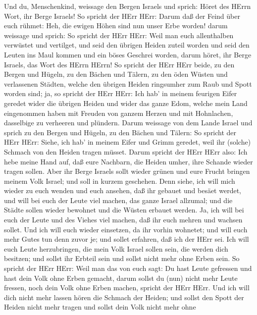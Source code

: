  Und du, Menschenkind, weissage den Bergen Israels und
sprich: Höret des HErrn Wort, ihr Berge Israels!  So spricht
der HErr HErr: Darum daß der Feind über euch rühmet: Heh, die ewigen
Höhen sind nun unser Erbe worden!  darum weissage und
sprich: So spricht der HErr HErr: Weil man euch allenthalben verwüstet
und vertilget, und seid den übrigen Heiden zuteil worden und seid den
Leuten ins Maul kommen und ein böses Geschrei worden,  darum
höret, ihr Berge Israels, das Wort des HErrn HErrn! So spricht der HErr
HErr beide, zu den Bergen und Hügeln, zu den Bächen und Tälern, zu den
öden Wüsten und verlassenen Städten, welche den übrigen Heiden
ringsumher zum Raub und Spott worden sind;  ja, so spricht
der HErr HErr: Ich hab' in meinem feurigen Eifer geredet wider die
übrigen Heiden und wider das ganze Edom, welche mein Land eingenommen
haben mit Freuden von ganzem Herzen und mit Hohnlachen, dasselbige zu
verheeren und plündern.  Darum weissage von dem Lande Israel
und sprich zu den Bergen und Hügeln, zu den Bächen und Tälern: So
spricht der HErr HErr: Siehe, ich hab' in meinem Eifer und Grimm
geredet, weil ihr (solche) Schmach von den Heiden tragen müsset.
 Darum spricht der HErr HErr also: Ich hebe meine Hand auf,
daß eure Nachbarn, die Heiden umher, ihre Schande wieder tragen sollen.
 Aber ihr Berge Israels sollt wieder grünen und eure Frucht
bringen meinem Volk Israel; und soll in kurzem geschehen. 
Denn siehe, ich will mich wieder zu euch wenden und euch ansehen, daß
ihr gebauet und besäet werdet,  und will bei euch der Leute
viel machen, das ganze Israel allzumal; und die Städte sollen wieder
bewohnet und die Wüsten erbauet werden.  Ja, ich will bei
euch der Leute und des Viehes viel machen, daß ihr euch mehren und
wachsen sollet. Und ich will euch wieder einsetzen, da ihr vorhin
wohnetet; und will euch mehr Gutes tun denn zuvor je; und sollet
erfahren, daß ich der HErr sei.  Ich will euch Leute
herzubringen, die mein Volk Israel sollen sein, die werden dich
besitzen; und sollst ihr Erbteil sein und sollst nicht mehr ohne Erben
sein.  So spricht der HErr HErr: Weil man das von euch
sagt: Du hast Leute gefressen und hast dein Volk ohne Erben gemacht,
 darum sollst du (nun) nicht mehr Leute fressen, noch dein
Volk ohne Erben machen, spricht der HErr HErr.  Und ich
will dich nicht mehr lassen hören die Schmach der Heiden; und sollst den
Spott der Heiden nicht mehr tragen und sollst dein Volk nicht mehr ohne
